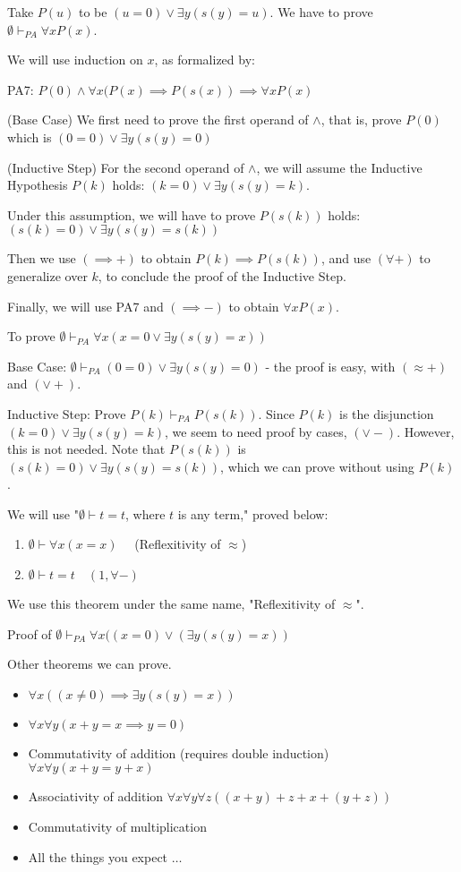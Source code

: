 \documentclass{article}
\begin{document}
Take $P(u)$ to be $(u = 0) \vee \exists y(s(y) = u)$. We have to prove $\emptyset \vdash_{PA} \forall x P(x)$.

We will use induction on $x$, as formalized by:

PA7: $P(0) \wedge \forall x (P(x) \implies P(s(x)) \implies \forall x P(x)$

(Base Case) We first need to prove the first operand of $\wedge$, that is, prove $P(0)$ which is $(0=0) \vee \exists y (s(y) = 0)$

(Inductive Step) For the second operand of $\wedge$, we will assume the Inductive Hypothesis $P(k)$ holds: $(k = 0) \vee \exists y (s(y) = k)$.

Under this assumption, we will have to prove $P(s(k))$ holds: $(s(k) = 0) \vee \exists y (s(y) = s(k))$

Then we use $(\implies +)$ to obtain $P(k) \implies P(s(k))$, and use $(\forall +)$ to generalize over $k$, to conclude the proof of the Inductive Step.

Finally, we will use PA7 and $(\implies -)$ to obtain $\forall x P(x)$.

To prove $\emptyset \vdash_{PA} \forall x (x = 0 \vee \exists y (s(y) = x))$

Base Case: $\emptyset \vdash_{PA} (0=0) \vee \exists y (s(y) = 0)$ - the proof is easy, with $(\approx +)$ and $(\vee +)$.

Inductive Step: Prove $P(k) \vdash_{PA} P(s(k))$. Since $P(k)$ is the disjunction $(k=0) \vee \exists y (s(y) = k)$, we seem to need proof by cases, $(\vee -)$. However, this is not needed. Note that $P(s(k))$ is $(s(k) = 0) \vee \exists y(s(y) = s(k))$, which we can prove without using $P(k)$.

We will use "$\emptyset \vdash t = t$, where $t$ is any term," proved below:
\begin{enumerate}
    \item $\emptyset \vdash \forall x (x = x) \quad $ (Reflexitivity of $\approx$)
    \item $\emptyset \vdash t = t \quad (1, \forall -)$
\end{enumerate}

We use this theorem under the same name, "Reflexitivity of $\approx$".

Proof of $\emptyset \vdash_{PA} \forall x ((x = 0) \vee (\exists y (s(y) = x))$


Other theorems we can prove.
\begin{itemize}
    \item $\forall x ((x \ne 0) \implies \exists y (s(y) = x))$ 
    \item $\forall x \forall y (x + y = x \implies y = 0)$
    \item Commutativity of addition (requires double induction) $\forall x \forall y (x + y = y + x)$ 
    \item Associativity of addition $\forall x \forall y \forall z ((x + y) + z + x + (y + z))$
    \item Commutativity of multiplication
    \item All the things you expect $\ldots$
\end{itemize}
\end{document}
